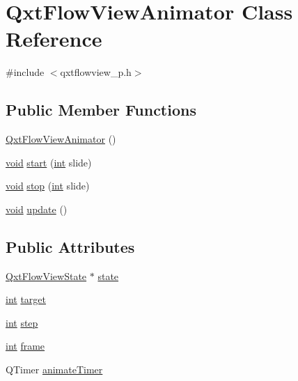 \hypertarget{class_qxt_flow_view_animator}{\section{Qxt\-Flow\-View\-Animator Class Reference}
\label{class_qxt_flow_view_animator}
}


{\ttfamily \#include $<$qxtflowview\-\_\-p.\-h$>$}

\subsection*{Public Member Functions}
\begin{DoxyCompactItemize}
\item 
\hyperlink{class_qxt_flow_view_animator_a6ba091e00eae3fc6bb8d1a6adfe62dfc}{Qxt\-Flow\-View\-Animator} ()
\item 
\hyperlink{group___u_a_v_objects_plugin_ga444cf2ff3f0ecbe028adce838d373f5c}{void} \hyperlink{class_qxt_flow_view_animator_a2d40f4661334f686aadecca9bb76d8de}{start} (\hyperlink{ioapi_8h_a787fa3cf048117ba7123753c1e74fcd6}{int} slide)
\item 
\hyperlink{group___u_a_v_objects_plugin_ga444cf2ff3f0ecbe028adce838d373f5c}{void} \hyperlink{class_qxt_flow_view_animator_af1ce90ab761ea82725867a22cf55010e}{stop} (\hyperlink{ioapi_8h_a787fa3cf048117ba7123753c1e74fcd6}{int} slide)
\item 
\hyperlink{group___u_a_v_objects_plugin_ga444cf2ff3f0ecbe028adce838d373f5c}{void} \hyperlink{class_qxt_flow_view_animator_afc9f57356b6881b55335f587f60888b5}{update} ()
\end{DoxyCompactItemize}
\subsection*{Public Attributes}
\begin{DoxyCompactItemize}
\item 
\hyperlink{class_qxt_flow_view_state}{Qxt\-Flow\-View\-State} $\ast$ \hyperlink{class_qxt_flow_view_animator_a8d82b13102602cd1bb1cc957a905edca}{state}
\item 
\hyperlink{ioapi_8h_a787fa3cf048117ba7123753c1e74fcd6}{int} \hyperlink{class_qxt_flow_view_animator_aaba6d75ee259eaa348df1753522f98c3}{target}
\item 
\hyperlink{ioapi_8h_a787fa3cf048117ba7123753c1e74fcd6}{int} \hyperlink{class_qxt_flow_view_animator_aafa502939797de9ae1b1ff90d1743e04}{step}
\item 
\hyperlink{ioapi_8h_a787fa3cf048117ba7123753c1e74fcd6}{int} \hyperlink{class_qxt_flow_view_animator_a3df3c0e20eecab444f9eb0987bc71215}{frame}
\item 
Q\-Timer \hyperlink{class_qxt_flow_view_animator_a3272a5ac0ebe67dd372398dee77388a3}{animate\-Timer}
\end{DoxyCompactItemize}


